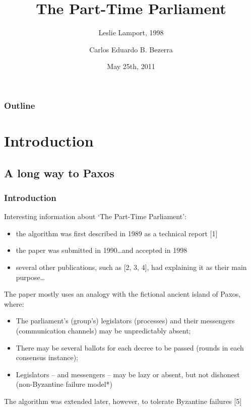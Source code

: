 \documentclass{beamer}
\title[{\makebox[.45\paperwidth]{The Part-Time Parliament\hfill\insertframenumber/\inserttotalframenumber}}]{The Part-Time Parliament}
\subtitle{Leslie Lamport, 1998}
\author{Carlos Eduardo B. Bezerra}
\institute[Universities of]
{
Faculty of Informatics\\
Universittà della Svizzera italiana
}
\date{May 25th, 2011}
\begin{document}
\begin{frame}
  \titlepage
\end{frame}



\begin{frame}
  \frametitle{Outline}
  \tableofcontents
\end{frame}



\section{Introduction}

\subsection{A long way to Paxos}

\begin{frame}
  \frametitle{Introduction}

  Interesting information about `The Part-Time Parliament':
  
  \begin{itemize}
    \item the algorithm was first described in 1989 as a technical report [1]
    \item the paper was submitted in 1990\ldots and accepted in 1998%
    \item several other publications, such as [2, 3, 4], had explaining it as their main purpose\ldots
  \end{itemize}

\end{frame}



\begin{frame}

  The paper mostly uses an analogy with the fictional ancient island of Paxos, where:
  \begin{itemize}
    \item The parliament's (group's) legislators (processes) and their messengers (communication channels) may be unpredictably absent;
    \item There may be several ballots for each decree to be passed (rounds in each consensus instance);
    \item Legislators -- and messengers -- may be lazy or absent, but not dishonest (non-Byzantine failure model*)
  \end{itemize}
  \vspace{6 mm}
  {\small * The algorithm was extended later, however, to tolerate Byzantine failures [5]}
\end{frame}
\end{document}

